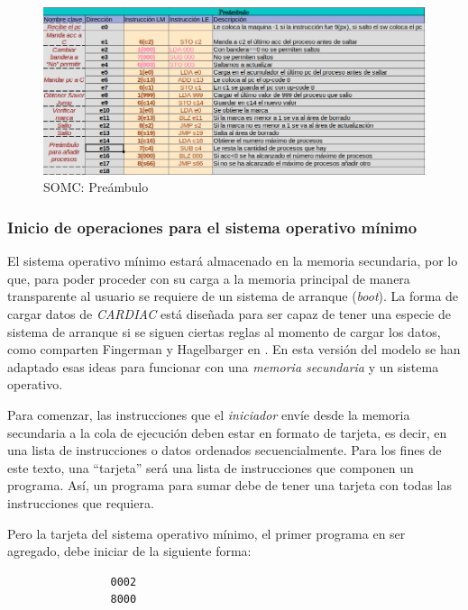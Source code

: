 \documentclass[letterpaper,12pt,oneside]{book}
\begin{document}
		\begin{figure}[h]		
			\centering
			\includegraphics[scale=0.51]{media/CARDIACC/Preambulo.png}
			\caption{SOMC: Preámbulo}
			\label{fig:somcPreambulo}
		\end{figure}
		
		\subsubsection{Inicio de operaciones para el sistema operativo mínimo}
		
		El sistema operativo mínimo estará almacenado en la memoria secundaria, por lo que, para poder proceder con su carga 
		a la memoria principal de manera transparente al 
		usuario se
		requiere de un sistema de arranque (\textit{boot}). La forma de cargar datos de \textit{CARDIAC} está diseñada para 
		ser capaz de tener una
		especie de sistema de arranque si se siguen ciertas reglas al momento de cargar los datos, como
		comparten Fingerman y Hagelbarger en \cite{fingerman_instruction_1968}.
		En esta versión del modelo se han
		adaptado esas ideas para funcionar con una \textit{memoria secundaria} y un sistema operativo. 
		
		Para comenzar,
		las instrucciones que el \textit{iniciador} envíe desde la memoria secundaria a la cola de 
		ejecución deben estar en formato de tarjeta, es decir, en una lista de instrucciones o datos ordenados secuencialmente. Para los fines
		de este texto, una ``tarjeta'' será una lista de instrucciones que componen un programa. Así, un programa para sumar debe de
		tener una tarjeta con todas las instrucciones que requiera.
		
		Pero la tarjeta del sistema operativo mínimo, el primer programa en ser agregado, debe iniciar de la siguiente forma:

		\begin{center}
		\begin{minipage}{0\textwidth}
			\begin{verbatim}
				0002
				8000
			\end{verbatim}	
		\end{minipage}
		\end{center}
		
\end{document}
